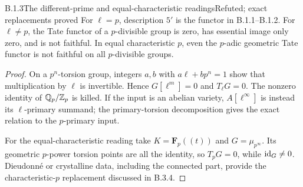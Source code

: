 \begin{result}{B.1.3}{The different-prime and equal-characteristic readings}{Refuted; exact replacements proved}
For $\ell=p$, description $5'$ is the functor in B.1.1--B.1.2.
For $\ell\ne p$, the Tate functor of a $p$-divisible group is zero,
has essential image only zero, and is not faithful. In equal
characteristic $p$, even the $p$-adic geometric Tate functor is
not faithful on all $p$-divisible groups.
\end{result}
\begin{proof}
On a $p^n$-torsion group, integers $a,b$ with $a\ell+bp^n=1$
show that multiplication by $\ell$ is invertible. Hence
$G[\ell^m]=0$ and $T_\ell G=0$. The nonzero identity of
$\mathbb Q_p/\mathbb Z_p$ is killed. If the input is an abelian variety,
$A[\ell^\infty]$ is instead its $\ell$-primary summand; the
primary-torsion decomposition gives the exact relation to the
$p$-primary input.

For the equal-characteristic reading take $K=\mathbf F_p((t))$
and $G=\mu_{p^\infty}$. Its geometric $p$-power torsion points
are all the identity, so $T_pG=0$, while $\operatorname{id}_G\ne0$.
Dieudonn\'e or crystalline data, including the connected part,
provide the characteristic-$p$ replacement discussed in B.3.4.
\end{proof}

